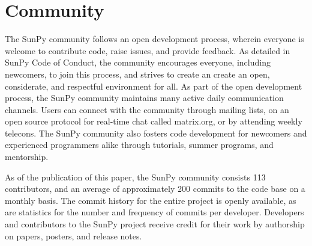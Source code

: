 \section{Community}
\label{sec:community}

The SunPy community follows an open development process, wherein everyone is welcome to contribute code, raise issues, and provide feedback.
As detailed in SunPy Code of Conduct, the community encourages everyone, including newcomers, to join this process, and strives to create an create an open, considerate, and respectful environment for all.
As part of the open development process, the SunPy community maintains many active daily communication channels.
Users can connect with the community through mailing lists, on an open source protocol for real-time chat called matrix.org, or by attending weekly telecons.
The SunPy community also fosters code development for newcomers and experienced programmers alike through tutorials, summer programs, and mentorship.

As of the publication of this paper, the SunPy community consists 113 contributors, and an average of approximately 200 commits to the code base on a monthly basis.
The commit history for the entire project is openly available, as are statistics for the number and frequency of commits per developer.
Developers and contributors to the SunPy project receive credit for their work by authorship on papers, posters, and release notes.
